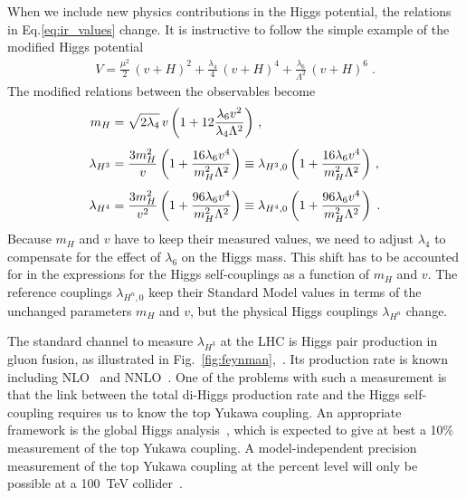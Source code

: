 \documentclass[aps,prd,11pt,tightenlines,superscriptaddress,nofootinbib,preprintnumbers,notitlepage]{revtex4-1}
\begin{document}
When we include new physics contributions in the Higgs potential, the
relations in Eq.\eqref{eq:ir_values} change. It is instructive to
follow the simple example of the modified Higgs
potential~\cite{lecture}
%
\begin{align}
 V = \frac{\mu^2}{2} \, (v+H)^2 
   + \frac{\lambda_4}{4} \, (v+H)^4 
   + \frac{\lambda_6}{\Lambda^2} \, (v+H)^6 \; .
\label{eq:mod-Higgs-pot}
\end{align}
%
The modified relations between the observables become
%
\begin{align}
 m_H &= \sqrt{2 \lambda_4} \, v \left( 1 +12 \frac{\lambda_6 v^2}{ 
\lambda_4 \Lambda^2} \right) \,,\notag \\[1ex]
 \lambda_{H^3} &= \frac{3 m_H^2}{v} \left( 1 + \frac{16 \lambda_6 v^4}{ 
m_H^2 \Lambda^2} \right) 
              \equiv  \lambda_{H^3,0} \left( 1 + \frac{16 
\lambda_6 v^4}{ m_H^2 \Lambda^2} \right)\,, \notag \\[1ex]
 \lambda_{H^4} &= \frac{3 m_H^2}{v^2} \left( 1 +
 \frac{96 \lambda_6 v^4}{m_H^2 \Lambda^2} \right) 
               \equiv  \lambda_{H^4,0} \left( 1 +
 \frac{96 \lambda_6 v^4}{m_H^2 \Lambda^2} \right) \; .
\label{eq:ir_shifts}
\end{align}
% 
Because $m_H$ and $v$ have to keep their measured values, we need to
adjust $\lambda_4$ to compensate for the effect of $\lambda_6$ on the
Higgs mass. This shift has to be accounted for in the expressions for
the Higgs self-couplings as a function of $m_H$ and $v$. The reference
couplings $\lambda_{H^n,0}$ keep their Standard Model values in terms
of the unchanged parameters $m_H$ and $v$, but the physical Higgs
couplings $\lambda_{H^n}$ change.\medskip

The standard channel to measure $\lambda_{H^3}$ at the LHC is Higgs
pair production in gluon fusion, as illustrated in
Fig.~\ref{fig:feynman},~\cite{orig,spirix,uli1,uli2,uli3,review_hh}.
Its production rate is known including NLO~\cite{nlo} and
NNLO~\cite{nnlo}.  One of the problems with such a measurement is that
the link between the total di-Higgs production rate and the Higgs
self-coupling requires us to know the top Yukawa coupling. An
appropriate framework is the global Higgs
analysis~\cite{legacy,hh_d6}, which is expected to give at best a 10\%
measurement of the top Yukawa coupling.  A model-independent precision
measurement of the top Yukawa coupling at the percent level will only
be possible at a 100~TeV collider~\cite{nimatron_yt}.
\end{document}
